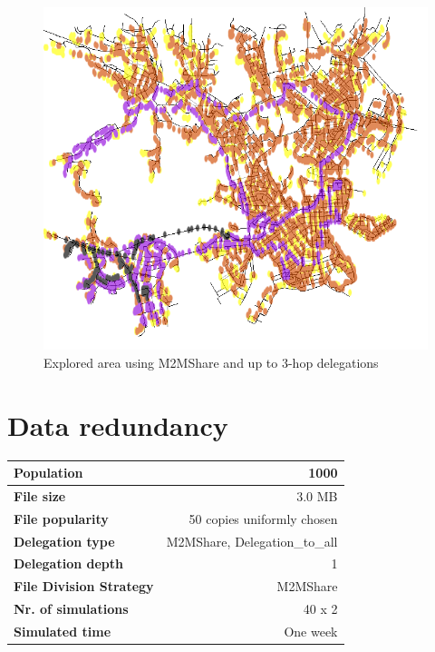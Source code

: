 \begin{figure}[htpb]
  \begin{center}
    \includegraphics[scale=0.35]{figure/mappa_3_hop.png}
    \caption{Explored area using M2MShare and up to 3-hop delegations}
    \label{mappa3Hop}
  \end{center}
\end{figure}


\newpage
\section{Data redundancy}
\begin{table}[h]
\begin{center}
\begin{tabular}{|l|r|}
\hline
\bfseries Population & 1000 \\
\hline
\bfseries File size & 3.0 MB \\
\hline
\bfseries File popularity & 50 copies uniformly chosen \\
\hline
\bfseries Delegation type & M2MShare, Delegation\_to\_all \\
\hline
\bfseries Delegation depth & 1 \\
\hline
\bfseries File Division Strategy & M2MShare \\
\hline
\bfseries Nr. of simulations & 40 x 2\\
\hline
\bfseries Simulated time & One week \\
\hline
\end{tabular}
\end{center}
\end{table}

